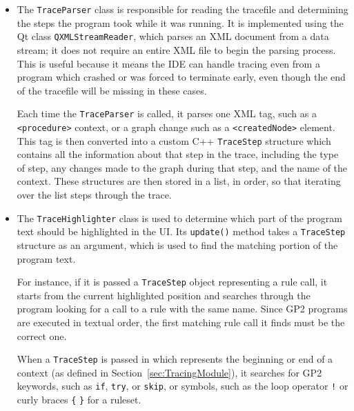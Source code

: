 \documentclass[authoryearcitations]{UoYCSproject}
\begin{document}
\begin{itemize}
    \item The \texttt{TraceParser} class is responsible for reading the tracefile
          and determining the steps the program took while it was running. It is
          implemented using the Qt class \texttt{QXMLStreamReader}, which
          parses an XML document from a data stream; it does not require an entire XML file
          to begin the parsing process. This is useful because it means the
          IDE can handle tracing even from a program which crashed or was forced
          to terminate early, even though the end of the tracefile will be missing
          in these cases.

          Each time the \texttt{TraceParser} is called, it parses one XML tag, such
          as a \texttt{<procedure>} context, or a graph change such as a
          \texttt{<createdNode>} element. This tag is then converted into a custom
          C++ \texttt{TraceStep} structure which contains all the information about
          that step in the trace, including the type of step, any changes made to
          the graph during that step, and the name of the context. These structures
          are then stored in a list, in order, so that iterating over the list steps
          through the trace.

    \item The \texttt{TraceHighlighter} class is used to determine which part of
          the program text should be highlighted in the UI. Its \texttt{update()}
          method takes a \texttt{TraceStep} structure as an argument, which is used
          to find the matching portion of the program text.

          For instance, if it is passed a \texttt{TraceStep} object representing a
          rule call, it starts from the current highlighted position and searches
          through the program looking for a call to a rule with the same name. Since
          GP2 programs are executed in textual order, the first matching rule call it
          finds must be the correct one.

          When a \texttt{TraceStep} is passed in which represents the beginning or
          end of a context (as defined in Section~\ref{sec:TracingModule}), it searches
          for GP2 keywords, such as \texttt{if}, \texttt{try}, or \texttt{skip}, or
          symbols, such as the loop operator \texttt{!} or curly braces \texttt{\{}
          \texttt{\}} for a ruleset.


\end{itemize}
\end{document}

